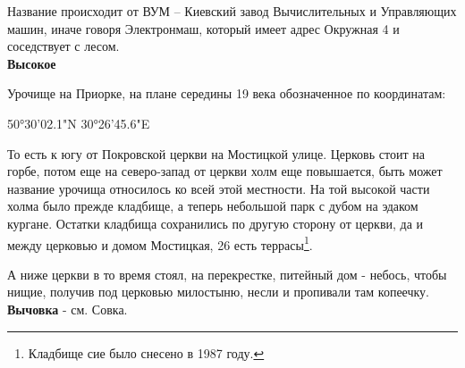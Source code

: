 Название происходит от ВУМ – Киевский завод Вычислительных и Управляющих машин, иначе говоря Электронмаш, который имеет адрес Окружная 4 и соседствует с лесом.\\

\textbf{Высокое}

Урочище на Приорке, на плане середины 19 века обозначенное по координатам:

50°30'02.1"N 30°26'45.6"E

То есть к югу от Покровской церкви на Мостицкой улице. Церковь стоит на горбе, потом еще на северо-запад от церкви холм еще повышается, быть может название урочища относилось ко всей этой местности.  На той высокой части холма было прежде кладбище, а теперь небольшой парк с дубом на эдаком кургане. Остатки кладбища сохранились по другую сторону от церкви, да и между церковью и домом Мостицкая, 26 есть террасы\footnote{Кладбище сие было снесено в 1987 году.}.

А ниже церкви в то время стоял, на перекрестке, питейный дом - небось, чтобы нищие, получив под церковью милостыню, несли и пропивали там копеечку.\\


\textbf{Вычовка} - см. Совка.\\